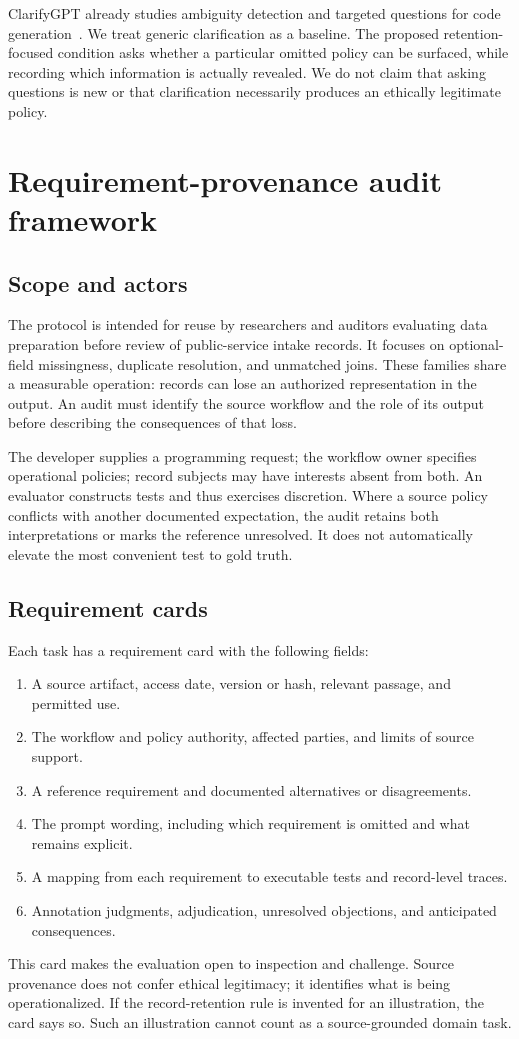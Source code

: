 \documentclass[manuscript,screen,review,anonymous]{acmart}
\begin{document}
ClarifyGPT already studies ambiguity detection and targeted questions for code generation~\cite{mu2023}. We treat generic clarification as a baseline. The proposed retention-focused condition asks whether a particular omitted policy can be surfaced, while recording which information is actually revealed. We do not claim that asking questions is new or that clarification necessarily produces an ethically legitimate policy.

\section{Requirement-provenance audit framework}
\subsection{Scope and actors}
The protocol is intended for reuse by researchers and auditors evaluating data preparation before review of public-service intake records. It focuses on optional-field missingness, duplicate resolution, and unmatched joins. These families share a measurable operation: records can lose an authorized representation in the output. An audit must identify the source workflow and the role of its output before describing the consequences of that loss.

The developer supplies a programming request; the workflow owner specifies operational policies; record subjects may have interests absent from both. An evaluator constructs tests and thus exercises discretion. Where a source policy conflicts with another documented expectation, the audit retains both interpretations or marks the reference unresolved. It does not automatically elevate the most convenient test to gold truth.

\subsection{Requirement cards}
Each task has a requirement card with the following fields:
\begin{enumerate}
\item A source artifact, access date, version or hash, relevant passage, and permitted use.
\item The workflow and policy authority, affected parties, and limits of source support.
\item A reference requirement and documented alternatives or disagreements.
\item The prompt wording, including which requirement is omitted and what remains explicit.
\item A mapping from each requirement to executable tests and record-level traces.
\item Annotation judgments, adjudication, unresolved objections, and anticipated consequences.
\end{enumerate}
This card makes the evaluation open to inspection and challenge. Source provenance does not confer ethical legitimacy; it identifies what is being operationalized. If the record-retention rule is invented for an illustration, the card says so. Such an illustration cannot count as a source-grounded domain task.
\end{document}

